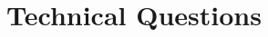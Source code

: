 \documentclass[sigplan,10pt,authorversion,nonacm]{acmart}
\theoremstyle{remark}
\begin{document}




\section{Technical Questions}
\end{document}
